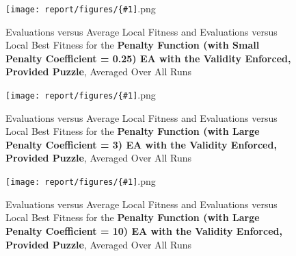 \documentclass[11pt]{article}
\newcommand{\fitnessplotcaption}[1]{\caption{Evaluations versus Average Local Fitness and Evaluations versus 
    Local Best Fitness for the \textbf{{#1}}, Averaged Over All Runs}}
\newcommand{\addgraphic}[1]{\centerline{\texttt{[image: report/figures/\{\#1]}.png}}}
\begin{document}
\begin{figure}
    \addgraphic{website_puzzle_validity_enforced_small_penalty_graph}
    \fitnessplotcaption{Penalty Function (with Small Penalty Coefficient = 0.25) EA with the Validity Enforced, Provided Puzzle}
    \label{fig:website_puzzle_validity_enforced_small_penalty_graph}
\end{figure}

\begin{figure}
    \addgraphic{website_puzzle_validity_enforced_graph}
    \fitnessplotcaption{Penalty Function (with Large Penalty Coefficient = 3) EA with the Validity Enforced, Provided Puzzle}
    \label{fig:website_puzzle_validity_enforced_med_penalty_graph}
\end{figure}

\begin{figure}
    \addgraphic{website_puzzle_validity_enforced_large_penalty_graph}
    \fitnessplotcaption{Penalty Function (with Large Penalty Coefficient = 10) EA with the Validity Enforced, Provided Puzzle}
    \label{fig:website_puzzle_validity_enforced_large_penalty_graph}
\end{figure}
\end{document}
